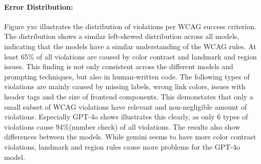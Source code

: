 \paragraph{Error Distribution:}
Figure yxc illustrates the distribution of violations per WCAG success criterion.
The distribution shows a similar left-skewed distribution across all models, indicating 
that the models have a similar understanding of the WCAG rules.\newline
At least 65\% of all violations are caused by color contrast and 
landmark and region issues. This finding is not only consistent across the different models
and prompting techniques, but also in human-written code.
\newline
The following types of violations are mainly caused by missing labels, wrong link colors, 
issues with header tags and the size of frontend components. This demonstates that only 
a small subset of WCAG violations have relevant and non-negligible amount of violations. 
Especially GPT-4o shows illustrates this clearly, as only 6 types of violations cause 
94\%(number check) of all violations.\newline
The results also show differences between the models. While gemini seems to have more color 
contrast violations, landmark and region rules cause
more problems for the GPT-4o model.


